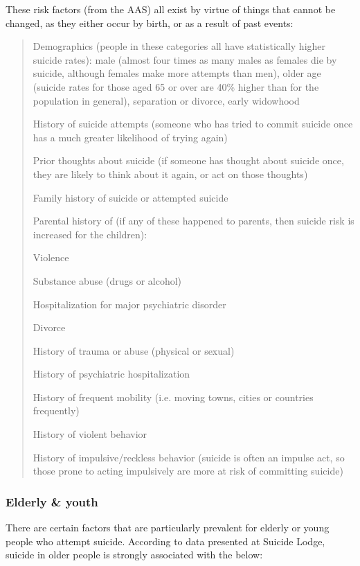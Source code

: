 \documentclass[12pt]{article}
\begin{document}
These risk factors (from the AAS) all exist by virtue of things that cannot be changed, as they either occur by birth, or as a result of past events:

\begin{verse}

Demographics (people in these categories all have statistically higher suicide rates): male (almost four times as many males as females die by suicide, although females make more attempts than men), older age (suicide rates for those aged 65 or over are 40\% higher than for the population in general), separation or divorce, early widowhood

History of suicide attempts (someone who has tried to commit suicide once has a much greater likelihood of trying again)

Prior thoughts about suicide (if someone has thought about suicide once, they are likely to think about it again, or act on those thoughts)

Family history of suicide or attempted suicide

Parental history of (if any of these happened to parents, then suicide risk is increased for the children):

Violence

Substance abuse (drugs or alcohol)

Hospitalization for major psychiatric disorder

Divorce

History of trauma or abuse (physical or sexual)

History of psychiatric hospitalization

History of frequent mobility (i.e. moving towns, cities or countries frequently)

History of violent behavior

History of impulsive/reckless behavior (suicide is often an impulse act, so those prone to acting impulsively are more at risk of committing suicide)

\end{verse}

\subsubsection{Elderly \& youth}

There are certain factors that are particularly prevalent for elderly or young people who attempt suicide. According to data presented at Suicide Lodge, suicide in older people is strongly associated with the below:
\end{document}
